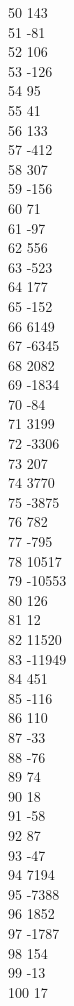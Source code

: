 { 50	143 \\
 51	-81 \\
 52	106 \\
 53	-126 \\
 54	95 \\
 55	41 \\
 56	133 \\
 57	-412 \\
 58	307 \\
 59	-156 \\
 60	71 \\
 61	-97 \\
 62	556 \\
 63	-523 \\
 64	177 \\
 65	-152 \\
 66	6149 \\
 67	-6345 \\
 68	2082 \\
 69	-1834 \\
 70	-84 \\
 71	3199 \\
 72	-3306 \\
 73	207 \\
 74	3770 \\
 75	-3875 \\
 76	782 \\
 77	-795 \\
 78	10517 \\
 79	-10553 \\
 80	126 \\
 81	12 \\
 82	11520 \\
 83	-11949 \\
 84	451 \\
 85	-116 \\
 86	110 \\
 87	-33 \\
 88	-76 \\
 89	74 \\
 90	18 \\
 91	-58 \\
 92	87 \\
 93	-47 \\
 94	7194 \\
 95	-7388 \\
 96	1852 \\
 97	-1787 \\
 98	154 \\
 99	-13 \\
 100	17 \\
}
